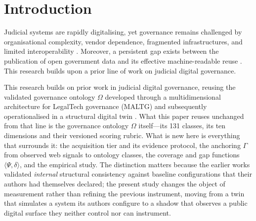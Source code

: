 \documentclass[engproc,proceedingpaper,submit,moreauthors]{Definitions/mdpi}
\begin{document}
\section{Introduction}
\label{sec:intro}
    Judicial systems are rapidly digitalising, yet governance remains challenged by organisational complexity, vendor dependence, fragmented infrastructures, and limited interoperability \cite{Rosa2013}. Moreover, a persistent gap exists between the publication of open government data and its effective machine-readable reuse \cite{Janssen2012,Attard2015}.
    This research builds upon a prior line of work on judicial digital governance.
    
    This research builds on prior work in judicial digital governance, reusing the validated governance ontology $\Omega$ developed through a multidimensional architecture for LegalTech governance (MALTG) \cite{paccha2026architecture,DeHaes2013} and subsequently operationalised in a structural digital twin \cite{Paccha2026SDT}.
    What this paper reuses unchanged from that line is the governance ontology $\Omega$ itself---its 131 classes, its ten dimensions and their versioned scoring rubric. What is new here is everything that surrounds it: the acquisition tier and its evidence protocol, the anchoring $\Gamma$ from observed web signals to ontology classes, the coverage and gap functions $\langle\Psi,\delta\rangle$, and the empirical study. The distinction matters because the earlier works validated \emph{internal} structural consistency against baseline configurations that their authors had themselves declared; the present study changes the object of measurement rather than refining the previous instrument, moving from a twin that simulates a system its authors configure to a shadow that observes a public digital surface they neither control nor can instrument.
\end{document}
